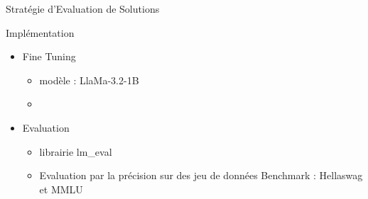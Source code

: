 \begin{frame}{Stratégie d'Evaluation de Solutions}
    \begin{block}{Implémentation}
        \begin{itemize}
            \item Fine Tuning
            \begin{itemize}
                \item modèle : LlaMa-3.2-1B
                \item 
            \end{itemize}
            \item Evaluation
            \begin{itemize}
                \item librairie lm\_eval
                \item Evaluation par la précision sur des jeu de données Benchmark : Hellaswag et MMLU
            \end{itemize}
        \end{itemize}

        
    \end{block}

\end{frame}

